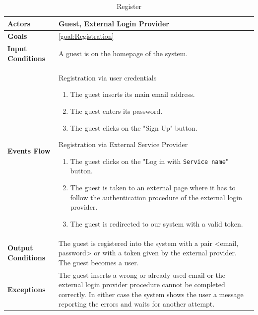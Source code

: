 \begin{table}[H]
	\centering
	\def\arraystretch{1.5}
	\begin{tabular}{|p{7cm}|p{7cm}|}
		\hline
		\textbf{Actors}            & Guest, External Login Provider		    \\ \hline
		\textbf{Goals}             & \ref{goal:Registration}           \\ \hline
		\textbf{Input Conditions}  & A guest is on the homepage of the system.           \\ \hline
		\textbf{Events Flow}       &   
		Registration via user credentials
		\begin{enumerate}
			\item The guest inserts its main email address.
			\item The guest enters its password.
			\item The guest clicks on the "Sign Up" button.
		\end{enumerate}
		Registration via External Service Provider
		\begin{enumerate}
			\item The guest clicks on the "Log in with \texttt{Service name}" button.
			\item The guest is taken to an external page where it has to follow the authentication procedure of the external login provider.
			\item The guest is redirected to our system with a valid token.
		\end{enumerate}       \\ \hline
		\textbf{Output Conditions} & The guest is registered into the system with a pair <email, password> or with a token given by the external provider. The guest becomes a user.          \\ \hline
		\textbf{Exceptions}        & The guest inserts a wrong or already-used email or the external login provider procedure cannot be completed correctly. In either case the system shows the user a message reporting the errors and waits for another attempt.            \\ \hline
	\end{tabular}
	\caption{Register}
\end{table}


